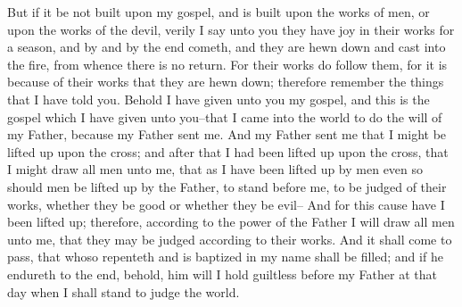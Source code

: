 But if it be not built upon my gospel, and is built upon the works of men, or upon the works of the devil, verily I say unto you they have joy in their works for a season, and by and by the end cometh, and they are hewn down and cast into the fire, from whence there is no return.
\bverse \iffalse For their works do follow them, for it is because of their works that they are hewn down; therefore remember the things that I have told you. \fi
For their works do follow them, for it is because of their works that they are hewn down; therefore remember the things that I have told you.
\bverse \iffalse Behold I have given unto you my gospel, and this is the gospel which I have given unto you--that I came into the world to do the will of my Father, because my Father sent me. \fi
Behold I have given unto you my gospel, and this is the gospel which I have given unto you--that I came into the world to do the will of my Father, because my Father sent me.
\bverse \iffalse And my Father sent me that I might be lifted up upon the cross; and after that I had been lifted up upon the cross, that I might draw all men unto me, that as I have been lifted up by men even so should men be lifted up by the Father, to stand before me, to be judged of their works, whether they be good or whether they be evil-- \fi
And my Father sent me that I might be lifted up upon the cross; and after that I had been lifted up upon the cross, that I might draw all men unto me, that as I have been lifted up by men even so should men be lifted up by the Father, to stand before me, to be judged of their works, whether they be good or whether they be evil--
\bverse \iffalse And for this cause have I been lifted up; therefore, according to the power of the Father I will draw all men unto me, that they may be judged according to their works. \fi
And for this cause have I been lifted up; therefore, according to the power of the Father I will draw all men unto me, that they may be judged according to their works.
\bverse \iffalse And it shall come to pass, that whoso repenteth and is baptized in my name shall be filled; and if he endureth to the end, behold, him will I hold guiltless before my Father at that day when I shall stand to judge the world. \fi
And it shall come to pass, that whoso repenteth and is baptized in my name shall be filled; and if he endureth to the end, behold, him will I hold guiltless before my Father at that day when I shall stand to judge the world.
\bverse \iffalse And he that endureth not unto the end, the same is he that is also hewn down and cast into the fire, from whence they can no more return, because of the justice of the Father. \fi

